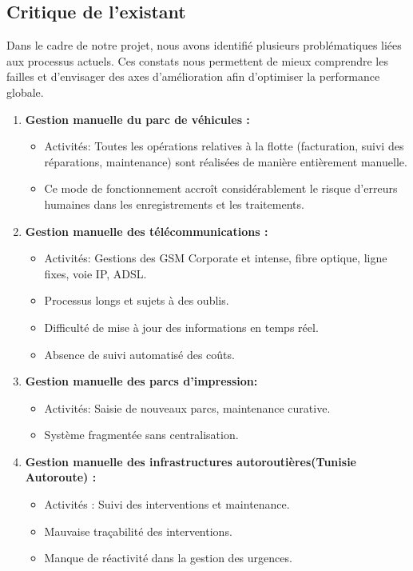 \documentclass[a4paper,11pt]{report}
\begin{document}
\subsection{Critique de l'existant}

Dans le cadre de notre projet, nous avons identifié plusieurs problématiques liées aux processus actuels. Ces constats nous permettent de mieux comprendre les failles et d'envisager des axes d'amélioration afin d'optimiser la performance globale.


\begin{enumerate}


\item \textbf{Gestion manuelle du parc de véhicules :}
\begin{itemize}
  \item Activités: Toutes les opérations relatives à la flotte (facturation, suivi des réparations, maintenance) sont réalisées de manière entièrement manuelle.
  \item Ce mode de fonctionnement accroît considérablement le risque d’erreurs humaines dans les enregistrements et les traitements.
\end{itemize}

\newpage
\item \textbf{Gestion manuelle des télécommunications :} 
\begin{itemize}
	\item Activités: Gestions des GSM Corporate et intense, fibre optique, ligne fixes, voie IP, ADSL.
	\item Processus longs et sujets à des oublis.
	\item Difficulté de mise à jour des informations en temps réel.
	\item Absence de suivi automatisé des coûts.	 
\end{itemize}

\item \textbf{Gestion manuelle des parcs d'impression:}
\begin{itemize}
	\item Activités: Saisie de nouveaux parcs, maintenance curative.
	\item Système fragmentée sans centralisation.
\end{itemize}

\item \textbf{Gestion manuelle des infrastructures autoroutières(Tunisie Autoroute) : } \nopagebreak[4]
\begin{itemize}
	\item Activités : Suivi des interventions et maintenance.
	\item Mauvaise traçabilité des interventions.
	\item Manque de réactivité dans la gestion des urgences.
\end{itemize}


\end{enumerate}
\end{document}

